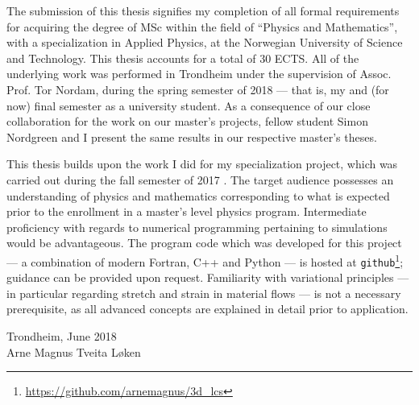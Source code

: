 The submission of this thesis signifies my completion of all formal
requirements for acquiring the degree of MSc within the field of ``Physics and
Mathematics'', with a specialization in Applied Physics, at the Norwegian
University of Science and Technology. This thesis accounts for a total of 30
ECTS. All of the underlying work was performed in Trondheim under the
supervision of Assoc. Prof. Tor Nordam, during the spring semester of 2018 ---
that is, my  and (for now) final semester as a university student. As a
consequence of our close collaboration for the work on our master's projects,
fellow student Simon Nordgreen and I present the same results in our respective
master's theses.

This thesis builds upon the work I did for my specialization project, which was
carried out during the fall semester of 2017 \parencite{loken2017sensitivity}.
The target audience possesses an understanding of physics and mathematics
corresponding to what is expected prior to the enrollment in a master's level
physics program. Intermediate proficiency with regards to numerical programming
pertaining to simulations would be advantageous. The program code which was
developed for this project --- a combination of modern Fortran, C++ and
Python --- is hosted at
\texttt{github}\footnote{\url{https://github.com/arnemagnus/3d_lcs}}; guidance
can be provided upon request. Familiarity with variational principles --- in
particular regarding stretch and strain in material flows --- is not a
necessary prerequisite, as all advanced concepts are explained in detail prior
to application.


\begin{minipage}[t]{\textwidth}
    \begin{flushright}
    Trondheim, June 2018\\
    Arne Magnus Tveita Løken
    \end{flushright}
\end{minipage}
